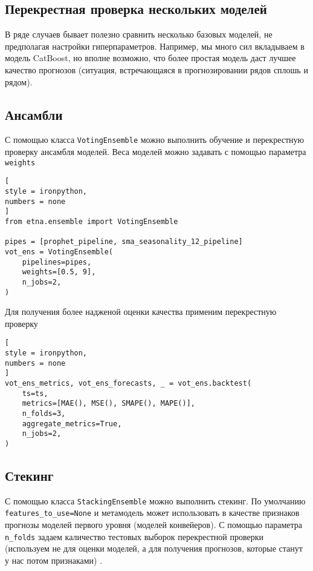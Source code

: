 \documentclass[%
	11pt,
	a4paper,
	utf8,
		]{article}
\begin{document}
\subsection{Перекрестная проверка нескольких моделей}

В ряде случаев бывает полезно сравнить несколько базовых моделей, не предполагая настройки гиперпараметров. Например, мы много сил вкладываем в модель CatBoost, но вполне возможно, что более простая модель даст лучшее качество прогнозов (ситуация, встречающаяся в прогнозировании рядов сплошь и рядом).

\subsection{Ансамбли}

С помощью класса \verb|VotingEnsemble| можно выполнить обучение и перекрестную проверку ансамбля моделей. Веса моделей можно задавать с помощью параметра \verb|weights|

\begin{lstlisting}[
style = ironpython,
numbers = none
]
from etna.ensemble import VotingEnsemble

pipes = [prophet_pipeline, sma_seasonality_12_pipeline]
vot_ens = VotingEnsemble(
    pipelines=pipes,
    weights=[0.5, 9],
    n_jobs=2,
)
\end{lstlisting}

Для получения более надженой оценки качества применим перекрестную проверку
\begin{lstlisting}[
style = ironpython,
numbers = none
]
vot_ens_metrics, vot_ens_forecasts, _ = vot_ens.backtest(
    ts=ts,
    metrics=[MAE(), MSE(), SMAPE(), MAPE()],
    n_folds=3,
    aggregate_metrics=True,
    n_jobs=2,
)
\end{lstlisting}

\subsection{Стекинг}

С помощью класса \verb|StackingEnsemble| можно выполнить стекинг. По умолчанию \verb|features_to_use=None| и метамодель может использовать в качестве признаков прогнозы моделей первого уровня (моделей конвейеров). С помощью параметра \verb|n_folds| задаем каличество тестовых выборок перекрестной проверки (используем не для оценки моделей, а для получения прогнозов, которые станут у нас потом признаками) \cite[]{gruzdev:time-series-2022}.
\end{document}
